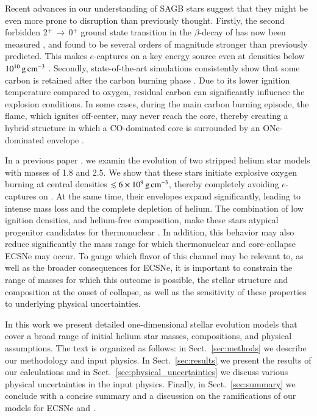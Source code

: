 \documentclass[main.tex]{subfiles}
\begin{document}
Recent advances in our understanding of SAGB stars suggest that they might be even more prone to disruption than previously thought. Firstly, the second forbidden 2$^{+}$\,$\rightarrow$\,0$^{+}$ 
ground state transition in the $\beta$-decay of  has now been measured \citep{kirsebom2019b}, and found to be several orders of magnitude stronger than previously predicted. This makes $e$-captures on  a key energy source even at densities below  $10^{10}\mathrm{\,g\,cm^{-3}}$ \citep{kirsebom2019a,kirsebom2019b,Leung:2019phz}. Secondly, state-of-the-art simulations consistently show that some carbon is retained after the carbon burning phase \citep[][see also Sect.~\ref{sec:results}]{Iben:1983ts,Garcia1997,siess2006,Denissenkov:2013qaa,Farmer:2015afs,doherty2015,Lecoanet:2016abca,Jones:2018ule}. Due to its lower ignition temperature compared to oxygen, residual carbon can significantly 
influence  the explosion conditions. In some cases, during the main carbon burning episode, the flame, which ignites off-center, may  never reach the core, thereby creating a hybrid structure in which a CO-dominated core is surrounded by an 
ONe-dominated envelope \citep[][and references therein]{Denissenkov:2013qaa,Farmer:2015afs}. 

In a previous paper \citep[][henceforth ]{antoniadis2020}, we examin the evolution of two stripped helium star models with masses of 1.8 and 2.5\msun. We show that these stars initiate explosive oxygen burning at central densities $\lesssim 6\times 10^9\mathrm{\,g\,cm^{-3}}$, thereby completely avoiding  $e$-captures on . At the same time, their envelopes expand significantly, leading to intense mass loss and the complete depletion of helium. The combination of low ignition densities, and helium-free composition, make these stars atypical progenitor candidates for thermonuclear  \ias \citep[henceforth (C)ONe \ias; see also][]{waldman2006a, waldman2008}. In addition, this behavior may also reduce significantly the mass range for which thermonuclear and core-collapse ECSNe may occur. To gauge  which flavor of \ia this channel may be relevant to, as well as the broader consequences for ECSNe, it is important to constrain the range of masses for which this outcome is possible, the  stellar structure and composition at the onset of collapse, as well as the sensitivity of these properties to underlying physical uncertainties. 

In this work we present detailed one-dimensional stellar evolution models that cover a broad range of initial helium star  masses, compositions, and physical assumptions. The text is organized as follows: in Sect.~\ref{sec:methods} we describe our methodology and input physics. In Sect.~\ref{sec:results} we present the results of our calculations and in Sect.~\ref{sec:physical_uncertainties} we discuss various physical uncertainties in the input physics. Finally, in Sect.~\ref{sec:summary} we conclude with a concise summary and a discussion on the ramifications of our models for ECSNe and \ias. 
\end{document}
